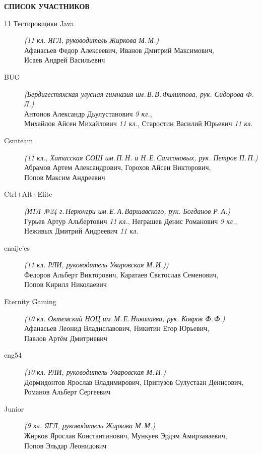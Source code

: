 \newpage
\noindent
\textbf{СПИСОК УЧАСТНИКОВ}
\begin{description}

\item[11 Тестировщики Java] \textit{(11 кл. ЯГЛ, руководитель Жиркова М.\,М.)} \\
Афанасьев Федор Алексеевич, Иванов Дмитрий Максимович, \\
Исаев Андрей Васильевич

\item[BUG] \textit{(Бердигестяхская улусная гимназия им.\,В.\,В.\,Филиппова, рук. Сидорова Ф.\,Л.)} \\
Антонов Александр Дьулустанович \textit{9 кл.}, \\
Михайлов Айсен Михайлович \textit{11 кл.}, Старостин Василий Юрьевич \textit{11 кл.}

\item[Csmteam] \textit{(11 кл., Хатасская СОШ им.\,П.\,Н. и Н.\,Е.\,Самсоновых, рук. Петров П.\,П.)} \\
Абрамов Артем Александрович, Горохов Айсен Викторович, \\
Попов Максим Андреевич

\item[Ctrl+Alt+Elite] \textit{(ИТЛ №24 г.\,Нерюнгри им.\,Е.\,А.\,Варшавского, рук. Богданов Р.\,А.)} \\
Гурьев Артур Альбертович \textit{11 кл.}, Неграшев Денис Романович \textit{9 кл.}, \\
Неживых Дмитрий Андреевич \textit{11 кл.}

\item[enaije'es] \textit{(11 кл. РЛИ, руководитель Уваровская М.\,И.))} \\
Федоров Альберт Викторович, Каратаев Святослав Семенович, \\
Попов Кирилл Николаевич

\item[Eternity Gaming] \textit{(10 кл. Октемский НОЦ им.\,М.\,Е.\,Николаева, рук. Ковров Ф.\,Ф.)} \\
Афанасьев Леонид Владиславович, Никитин Егор Юрьевич, \\
Павлов Артём Дмитриевич

\item[eng54] \textit{(10 кл. РЛИ, руководитель Уваровская М.\,И.)} \\
Дормидонтов Ярослав Владимирович, Припузов Сулустаан Денисович, \\
Романов Альберт Сергеевич

\item[Junior] \textit{(9 кл. ЯГЛ, руководитель Жиркова М.\,М.)} \\
Жирков Ярослав Константинович, Мункуев Эрдэм Амирзаяаевич, \\
Попов Эльдар Леонидович


\end{description}

